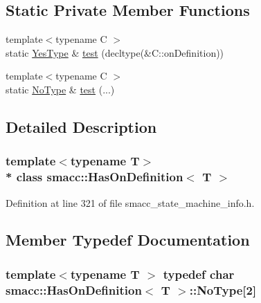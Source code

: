 \subsection*{Static Private Member Functions}
\begin{DoxyCompactItemize}
\item 
{\footnotesize template$<$typename C $>$ }\\static \hyperlink{classsmacc_1_1HasOnDefinition_af147416543b9d5a19d3dfc4f3f0d42a6}{Yes\+Type} \& \hyperlink{classsmacc_1_1HasOnDefinition_ab3431b8ab4f2d559df5bee2c06e75d39}{test} (decltype(\&C\+::on\+Definition))
\item 
{\footnotesize template$<$typename C $>$ }\\static \hyperlink{classsmacc_1_1HasOnDefinition_ab424fbc32a091d6271cabe47eb0725ca}{No\+Type} \& \hyperlink{classsmacc_1_1HasOnDefinition_a1cd0d70f99ffb2ac329a72e61815d5e4}{test} (...)
\end{DoxyCompactItemize}


\subsection{Detailed Description}
\subsubsection*{template$<$typename T$>$\\*
class smacc\+::\+Has\+On\+Definition$<$ T $>$}



Definition at line 321 of file smacc\+\_\+state\+\_\+machine\+\_\+info.\+h.



\subsection{Member Typedef Documentation}
\subsubsection[{\texorpdfstring{No\+Type}{NoType}}]{\setlength{\rightskip}{0pt plus 5cm}template$<$typename T $>$ typedef char {\bf smacc\+::\+Has\+On\+Definition}$<$ T $>$\+::No\+Type\mbox{[}2\mbox{]}\hspace{0.3cm}{\ttfamily [private]}}\hypertarget{classsmacc_1_1HasOnDefinition_ab424fbc32a091d6271cabe47eb0725ca}{}\label{classsmacc_1_1HasOnDefinition_ab424fbc32a091d6271cabe47eb0725ca}


